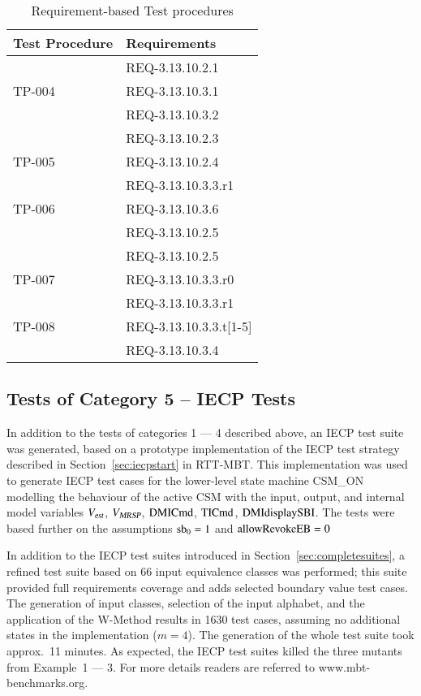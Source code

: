 \begin{table}[htbp]
 \centering
\caption{\label{table:tp-req} Requirement-based Test procedures}
\bgroup
\def\arraystretch{1.5}%
\begin{tabular}{|l|l|}\hline\hline
Test Procedure & Requirements \\\hline
               & REQ-3.13.10.2.1 \\
 TP-004        & REQ-3.13.10.3.1\\
               & REQ-3.13.10.3.2\\\hline
               & REQ-3.13.10.2.3\\
TP-005         & REQ-3.13.10.2.4\\
               & REQ-3.13.10.3.3.r1\\\hline
TP-006         & REQ-3.13.10.3.6\\
               & REQ-3.13.10.2.5\\\hline
               & REQ-3.13.10.2.5\\
TP-007         & REQ-3.13.10.3.3.r0\\
               & REQ-3.13.10.3.3.r1\\\hline
TP-008         & REQ-3.13.10.3.3.t[1-5]\\
               & REQ-3.13.10.3.4\\


\hline \hline
\end{tabular}
\egroup
\end{table}



\subsection{Tests of Category 5 -- IECP Tests}\label{sec:iecptestresults}

In addition to the   tests of categories 1 --- 4 described above, an IECP test suite was
generated, based on a prototype implementation of the IECP test strategy described in
Section~\ref{sec:iecpstart} in RTT-MBT.   This implementation was used to generate IECP test cases
for the lower-level state machine CSM\_ON modelling 
the behaviour of the active CSM with the  input, output, and 
internal model variables  ${V_{\text{\sl est}}}$, ${V_{\text{\sl MRSP}}}$, $\text{DMICmd}$, $\text{TICmd}$, $\text{DMIdisplaySBI}$. The tests were based further on the assumptions $\text{sb}_0 = 1$ and $\text{allowRevokeEB} = 0$

In addition to the IECP test suites introduced in Section~\ref{sec:completesuites}, a refined test suite based on 66 input equivalence classes was performed; this suite provided full requirements
coverage and adds selected boundary value test cases.   The generation of input classes, selection of the input alphabet, and the application of the W-Method results in 1630 test cases,
assuming no additional states in the implementation ($m = 4$).
The generation of the whole test suite took approx.~11 minutes. 
As expected, the IECP test suites killed the three mutants from Example~1 --- 3.
 For more details readers are referred to www.mbt-benchmarks.org. 

 

